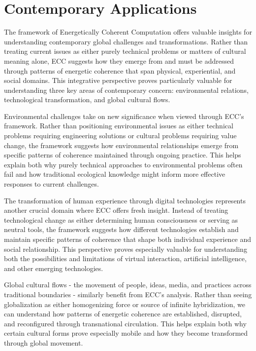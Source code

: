 \section{Contemporary Applications}

The framework of Energetically Coherent Computation offers valuable insights for understanding contemporary global challenges and transformations. Rather than treating current issues as either purely technical problems or matters of cultural meaning alone, ECC suggests how they emerge from and must be addressed through patterns of energetic coherence that span physical, experiential, and social domains. This integrative perspective proves particularly valuable for understanding three key areas of contemporary concern: environmental relations, technological transformation, and global cultural flows.

Environmental challenges take on new significance when viewed through ECC's framework. Rather than positioning environmental issues as either technical problems requiring engineering solutions or cultural problems requiring value change, the framework suggests how environmental relationships emerge from specific patterns of coherence maintained through ongoing practice. This helps explain both why purely technical approaches to environmental problems often fail and how traditional ecological knowledge might inform more effective responses to current challenges.

The transformation of human experience through digital technologies represents another crucial domain where ECC offers fresh insight. Instead of treating technological change as either determining human consciousness or serving as neutral tools, the framework suggests how different technologies establish and maintain specific patterns of coherence that shape both individual experience and social relationship. This perspective proves especially valuable for understanding both the possibilities and limitations of virtual interaction, artificial intelligence, and other emerging technologies.

Global cultural flows - the movement of people, ideas, media, and practices across traditional boundaries - similarly benefit from ECC's analysis. Rather than seeing globalization as either homogenizing force or source of infinite hybridization, we can understand how patterns of energetic coherence are established, disrupted, and reconfigured through transnational circulation. This helps explain both why certain cultural forms prove especially mobile and how they become transformed through global movement.

